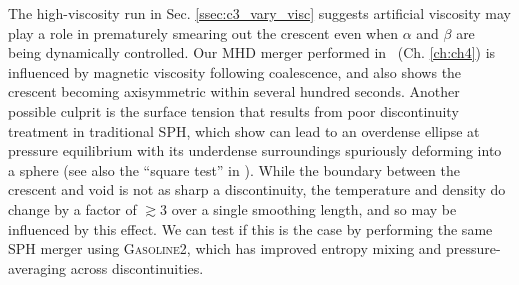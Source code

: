 The high-viscosity run in Sec. \ref{ssec:c3_vary_visc} suggests artificial viscosity may play a role in prematurely smearing out the crescent even when $\alpha$ and $\beta$ are being dynamically controlled.  Our MHD merger performed in \arepo\ (Ch. \ref{ch:ch4}) is influenced by magnetic viscosity following coalescence, and also shows the crescent becoming axisymmetric within several hundred seconds.  Another possible culprit is the surface tension that results from poor discontinuity treatment in traditional SPH, which \cite{hesss10} show can lead to an overdense ellipse at pressure equilibrium with its underdense surroundings spuriously deforming into a sphere (see also the ``square test'' in \cite{hopk15}).  While the boundary between the crescent and void is not as sharp a discontinuity, the temperature and density do change by a factor of $\gtrsim3$ over a single smoothing length, and so may be influenced by this effect.  We can test if this is the case by performing the same SPH merger using \textsc{Gasoline2}, which has improved entropy mixing and pressure-averaging across discontinuities.



